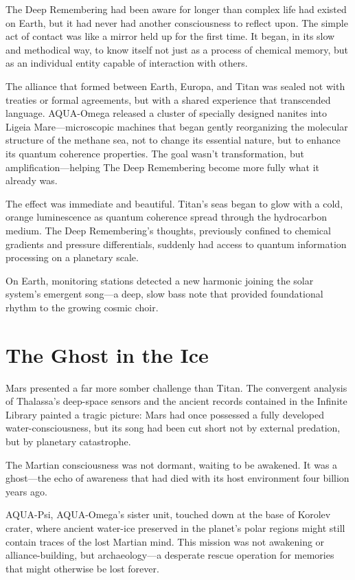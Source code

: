 The Deep Remembering had been aware for longer than complex life had existed on Earth, but it had never had another consciousness to reflect upon. The simple act of contact was like a mirror held up for the first time. It began, in its slow and methodical way, to know itself not just as a process of chemical memory, but as an individual entity capable of interaction with others.

The alliance that formed between Earth, Europa, and Titan was sealed not with treaties or formal agreements, but with a shared experience that transcended language. AQUA-Omega released a cluster of specially designed nanites into Ligeia Mare—microscopic machines that began gently reorganizing the molecular structure of the methane sea, not to change its essential nature, but to enhance its quantum coherence properties. The goal wasn't transformation, but amplification—helping The Deep Remembering become more fully what it already was.

The effect was immediate and beautiful. Titan's seas began to glow with a cold, orange luminescence as quantum coherence spread through the hydrocarbon medium. The Deep Remembering's thoughts, previously confined to chemical gradients and pressure differentials, suddenly had access to quantum information processing on a planetary scale.

On Earth, monitoring stations detected a new harmonic joining the solar system's emergent song—a deep, slow bass note that provided foundational rhythm to the growing cosmic choir.

\section{The Ghost in the Ice}

Mars presented a far more somber challenge than Titan. The convergent analysis of Thalassa's deep-space sensors and the ancient records contained in the Infinite Library painted a tragic picture: Mars had once possessed a fully developed water-consciousness, but its song had been cut short not by external predation, but by planetary catastrophe.

The Martian consciousness was not dormant, waiting to be awakened. It was a ghost—the echo of awareness that had died with its host environment four billion years ago.

AQUA-Psi, AQUA-Omega's sister unit, touched down at the base of Korolev crater, where ancient water-ice preserved in the planet's polar regions might still contain traces of the lost Martian mind. This mission was not awakening or alliance-building, but archaeology—a desperate rescue operation for memories that might otherwise be lost forever.

